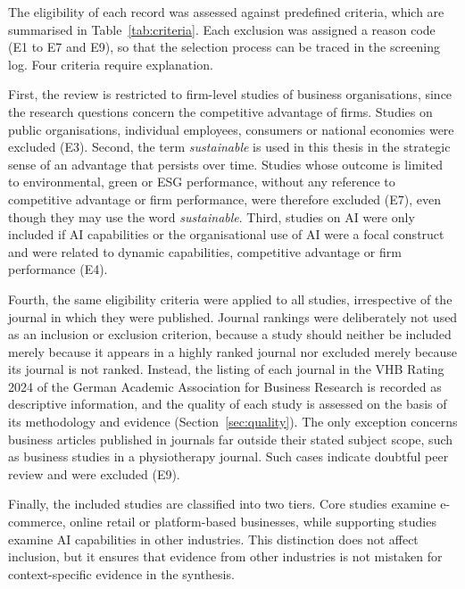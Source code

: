 The eligibility of each record was assessed against predefined criteria, which are summarised in Table~\ref{tab:criteria}. Each exclusion was assigned a reason code (E1 to E7 and E9), so that the selection process can be traced in the screening log. Four criteria require explanation.

First, the review is restricted to firm-level studies of business organisations, since the research questions concern the competitive advantage of firms. Studies on public organisations, individual employees, consumers or national economies were excluded (E3). Second, the term \emph{sustainable} is used in this thesis in the strategic sense of an advantage that persists over time. Studies whose outcome is limited to environmental, green or ESG performance, without any reference to competitive advantage or firm performance, were therefore excluded (E7), even though they may use the word \emph{sustainable}. Third, studies on AI were only included if AI capabilities or the organisational use of AI were a focal construct and were related to dynamic capabilities, competitive advantage or firm performance (E4).

Fourth, the same eligibility criteria were applied to all studies, irrespective of the journal in which they were published. Journal rankings were deliberately not used as an inclusion or exclusion criterion, because a study should neither be included merely because it appears in a highly ranked journal nor excluded merely because its journal is not ranked. Instead, the listing of each journal in the VHB Rating 2024 of the German Academic Association for Business Research is recorded as descriptive information, and the quality of each study is assessed on the basis of its methodology and evidence (Section~\ref{sec:quality}). The only exception concerns business articles published in journals far outside their stated subject scope, such as business studies in a physiotherapy journal. Such cases indicate doubtful peer review and were excluded (E9).

Finally, the included studies are classified into two tiers. Core studies examine e-commerce, online retail or platform-based businesses, while supporting studies examine AI capabilities in other industries. This distinction does not affect inclusion, but it ensures that evidence from other industries is not mistaken for context-specific evidence in the synthesis.

